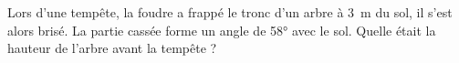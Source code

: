 %
%
    Lors d'une tempête, la foudre a frappé le tronc d'un arbre à \SI{3}{m} du sol, il s'est alors brisé. La partie cassée forme un angle de \ang{58} avec le sol. Quelle était la hauteur de l'arbre avant la tempête ?
